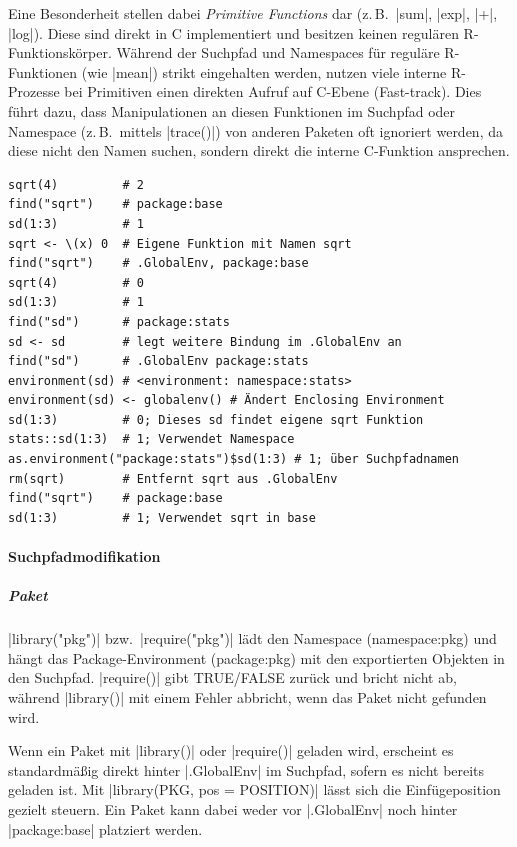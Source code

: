\documentclass[10pt,twocolumn]{scrartcl}
\renewcommand{\lstinline}{\mycoloredinline}
\begin{document}
Eine Besonderheit stellen dabei \emph{Primitive Functions} dar (z.\,B.\ \lstinline|sum|, \lstinline|exp|, \lstinline|+|, \lstinline|log|). Diese sind direkt in C implementiert und besitzen keinen regulären R-Funktionskörper. Während der Suchpfad und Namespaces für reguläre R-Funktionen (wie \lstinline|mean|) strikt eingehalten werden, nutzen viele interne R-Prozesse bei Primitiven einen direkten Aufruf auf C-Ebene (Fast-track). Dies führt dazu, dass Manipulationen an diesen Funktionen im Suchpfad oder Namespace (z.\,B.\ mittels \lstinline|trace()|) von anderen Paketen oft ignoriert werden, da diese nicht den Namen suchen, sondern direkt die interne C-Funktion ansprechen.

\begin{lstlisting}
sqrt(4)         # 2
find("sqrt")    # package:base
sd(1:3)         # 1
sqrt <- \(x) 0  # Eigene Funktion mit Namen sqrt
find("sqrt")    # .GlobalEnv, package:base
sqrt(4)         # 0
sd(1:3)         # 1
find("sd")      # package:stats
sd <- sd        # legt weitere Bindung im .GlobalEnv an
find("sd")      # .GlobalEnv package:stats
environment(sd) # <environment: namespace:stats>
environment(sd) <- globalenv() # Ändert Enclosing Environment
sd(1:3)         # 0; Dieses sd findet eigene sqrt Funktion
stats::sd(1:3)  # 1; Verwendet Namespace
as.environment("package:stats")$sd(1:3) # 1; über Suchpfadnamen
rm(sqrt)        # Entfernt sqrt aus .GlobalEnv
find("sqrt")    # package:base
sd(1:3)         # 1; Verwendet sqrt in base
\end{lstlisting}


\paragraph{Suchpfadmodifikation}

\subparagraph{Paket}

\lstinline|library("pkg")| bzw.\ \lstinline|require("pkg")| lädt den Namespace (namespace:pkg) und hängt das Package-Environment (package:pkg) mit den exportierten Objekten in den Suchpfad.
\lstinline|require()| gibt TRUE/FALSE zurück und bricht nicht ab, während \lstinline|library()| mit einem Fehler abbricht, wenn das Paket nicht gefunden wird.

Wenn ein Paket mit \lstinline|library()| oder \lstinline|require()| geladen wird, erscheint es standardmäßig direkt hinter \lstinline|.GlobalEnv| im Suchpfad, sofern es nicht bereits geladen ist.
Mit \lstinline|library(PKG, pos = POSITION)| lässt sich die Einfügeposition gezielt steuern. 
Ein Paket kann dabei weder vor \lstinline|.GlobalEnv| noch hinter \lstinline|package:base| platziert werden.
\end{document}
